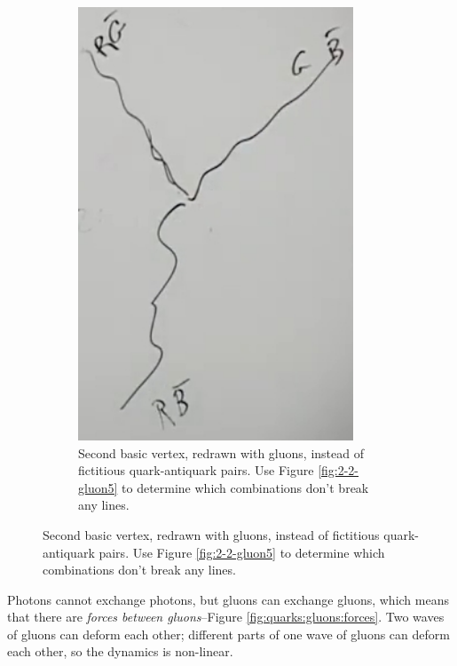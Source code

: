 \documentclass[]{article}
\begin{document}
\begin{figure}[H]
\begin{subfigure}[t]{0.40\textwidth}
	\end{subfigure}
	\begin{subfigure}[t]{0.45\textwidth}
		\caption{Second basic vertex, redrawn with gluons, instead of fictitious quark-antiquark pairs. Use Figure \ref{fig:2-2-gluon5} to determine which combinations don't break any lines.}\label{fig:2-2-gluon6}
		\includegraphics[width=0.9\textwidth]{2-2-gluon6}
	\end{subfigure}
\end{figure}

Photons cannot exchange photons, but gluons can exchange gluons, which means that there are \emph{forces between gluons}--Figure \ref{fig:quarks:gluons:forces}. Two waves of gluons can deform each other; different parts of one wave of gluons can deform each other, so the dynamics is non-linear.
\end{document}
